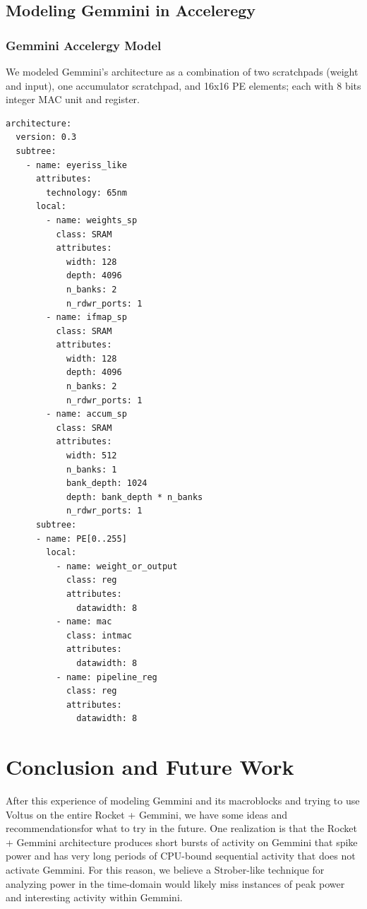 \documentclass[sigconf]{acmart}
\begin{document}
\subsection{Modeling Gemmini in Acceleregy}
\subsubsection{Gemmini Accelergy Model}
We modeled Gemmini's architecture as a combination of two scratchpads (weight and input), one accumulator scratchpad, and 16x16 PE elements; each with 8 bits integer MAC unit and register.

\begin{verbatim}
architecture:
  version: 0.3
  subtree:
    - name: eyeriss_like
      attributes:
        technology: 65nm
      local:
        - name: weights_sp
          class: SRAM
          attributes:
            width: 128
            depth: 4096
            n_banks: 2
            n_rdwr_ports: 1
        - name: ifmap_sp
          class: SRAM
          attributes:
            width: 128
            depth: 4096
            n_banks: 2
            n_rdwr_ports: 1
        - name: accum_sp
          class: SRAM
          attributes:
            width: 512
            n_banks: 1
            bank_depth: 1024
            depth: bank_depth * n_banks
            n_rdwr_ports: 1
      subtree:
      - name: PE[0..255]
        local:
          - name: weight_or_output
            class: reg
            attributes:
              datawidth: 8
          - name: mac
            class: intmac
            attributes:
              datawidth: 8
          - name: pipeline_reg
            class: reg
            attributes:
              datawidth: 8
\end{verbatim}

\section{Conclusion and Future Work}
After this experience of modeling Gemmini and its macroblocks and trying to use Voltus on the entire Rocket + Gemmini, we have some ideas and recommendationsfor what to try in the future.
One realization is that the Rocket + Gemmini architecture produces short bursts of activity on Gemmini that spike power and has very long periods of CPU-bound sequential activity that does not activate Gemmini.
For this reason, we believe a Strober-like technique for analyzing power in the time-domain would likely miss instances of peak power and interesting activity within Gemmini.
\end{document}
